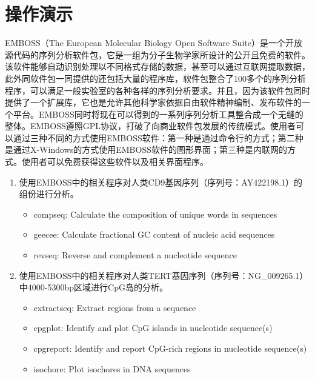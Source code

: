 \section{操作演示}
EMBOSS（The European Molecular Biology Open Software Suite）是一个开放源代码的序列分析软件包，它是一组为分子生物学家所设计的公开且免费的软件。该软件能够自动识别处理以不同格式存储的数据，甚至可以通过互联网提取数据，此外同软件包一同提供的还包括大量的程序库，软件包整合了100多个的序列分析程序，可以满足一般实验室的各种各样的序列分析要求。并且，因为该软件包同时提供了一个扩展库，它也是允许其他科学家依据自由软件精神编制、发布软件的一个平台。EMBOSS同时将现在可以得到的一系列序列分析工具整合成一个无缝的整体。EMBOSS遵照GPL协议，打破了向商业软件包发展的传统模式。使用者可以通过三种不同的方式使用EMBOSS软件：第一种是通过命令行的方式；第二种是通过X-Windows的方式使用EMBOSS软件的图形界面；第三种是内联网的方式。使用者可以免费获得这些软件以及相关界面程序。

\begin{enumerate}
	\item 使用EMBOSS中的相关程序对人类CD9基因序列（序列号：AY422198.1）的组份进行分析。
		\begin{itemize}
			\item compseq: Calculate the composition of unique words in sequences
			\item geecee: Calculate fractional GC content of nucleic acid sequences
			\item revseq: Reverse and complement a nucleotide sequence
		\end{itemize}
	\item 使用EMBOSS中的相关程序对人类TERT基因序列（序列号：NG\_009265.1）中4000-5300bp区域进行CpG岛的分析。
		\begin{itemize}
			\item extractseq: Extract regions from a sequence
			\item cpgplot: Identify and plot CpG islands in nucleotide sequence(s)
			\item cpgreport: Identify and report CpG-rich regions in nucleotide sequence(s)
			\item isochore: Plot isochores in DNA sequences
		\end{itemize}
\end{enumerate}

